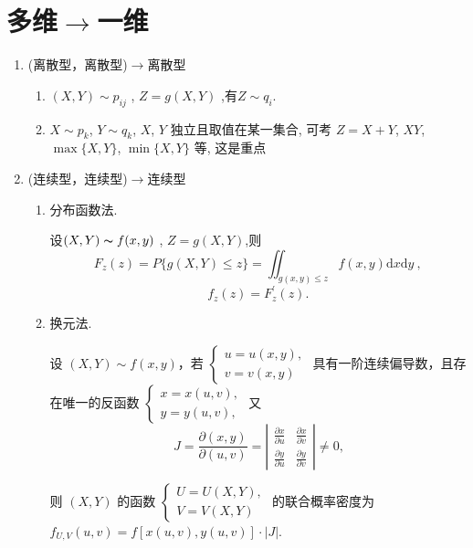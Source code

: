 
\section{多维$\rightarrow$一维}
\begin{enumerate}
      \item (离散型，离散型)$\rightarrow$离散型
            \begin{enumerate}
                  \item $(X,Y)\sim p_{ij}$ , $Z=g(X,Y)$ ,有$Z\sim q_i$.
                  \item $X \sim p_k$, $Y \sim q_k$, $X$, $Y$ 独立且取值在某一集合, 可考 $Z = X + Y$, $XY$, $\max\{X, Y\}$, $\min\{X, Y\}$ 等, 这是重点
            \end{enumerate}
      \item (连续型，连续型)$\rightarrow$连续型
            \begin{enumerate}
                  \item 分布函数法.

                        设$( X, Y) \thicksim f( x, y)$ , $Z= g( X, Y)$,则
                        $$F_{z}(z)=P\{g(X,Y)\leqslant z\}=\iint_{g(x,y)\leqslant z}f(x,y)\mathrm{d}x\mathrm{d}y\:,$$
                        $$f_z(z)=F_z^{\prime}(z).$$
                  \item 换元法.

                        设 $(X,Y) \sim f(x,y)$，若 $\begin{cases} u=u(x,y), \\ v=v(x,y) \end{cases}$ 具有一阶连续偏导数，且存在唯一的反函数 $\begin{cases} x=x(u,v), \\ y=y(u,v), \end{cases}$ 又
                        $$J=\frac{\partial(x,y)}{\partial(u,v)}=\left| \begin{array}{cc} \frac{\partial x}{\partial u} & \frac{\partial x}{\partial v} \\ \frac{\partial y}{\partial u} & \frac{\partial y}{\partial v} \end{array} \right| \neq 0 \text{,}$$

                        则 $(X,Y)$ 的函数 $\begin{cases} U=U(X,Y), \\ V=V(X,Y) \end{cases}$ 的联合概率密度为 $f_{U,V}(u,v)=f[x(u,v),y(u,v)]\cdot|J|$.


\end{enumerate}
\end{enumerate}
